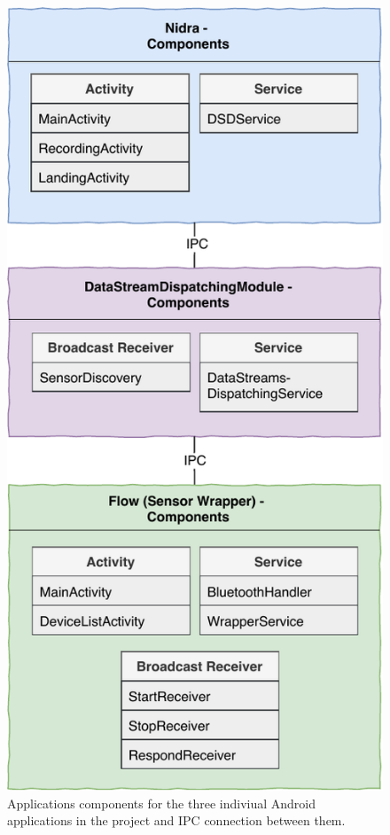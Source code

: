 \begin{figure}
    \centering
    \includegraphics[scale=0.95]{images/Android_Components.pdf}
    \caption{Applications components for the three indiviual Android applications in the project and IPC connection between them.}
    \label{fig:app_components}
\end{figure}


